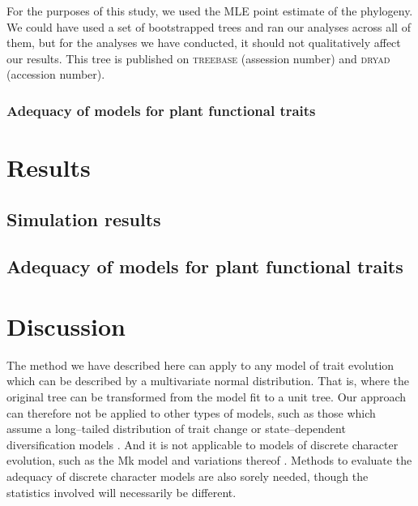 \documentclass[12pt]{article}
\begin{document}
For the purposes of this study, we used the MLE point estimate of the phylogeny. We could have used a set of bootstrapped trees and ran our analyses across all of them, but for the analyses we have conducted, it should not qualitatively affect our results. This tree is published on \textsc{treebase} (assession number) and \textsc{dryad} (accession number).

\subsubsection{Adequacy of models for plant functional traits}


\section{Results}

\subsection{Simulation results}

\subsection{Adequacy of models for plant functional traits}


\section{Discussion}

The method we have described here can apply to any model of trait evolution which can be described by a multivariate normal distribution. That is, where the original tree can be transformed from the model fit to a unit tree. Our approach can therefore not be applied to other types of models, such as those which assume a long--tailed distribution of trait change \citep[e.g.][]{Landis2012} or state--dependent diversification models \citep[e.g.][]{Bokma2008, Bokma2010, FitzJohn2010}. And it is not applicable to models of discrete character evolution, such as the Mk model \citep{Pagel1994, Lewis2001} and variations thereof \citep[e.g.][]{Maddison2007, WagnerMarcot2010, Mazeralli2012, Beaulieu2013} \citep[but see Felsenstein's threshold model;][]{Felsenstein2005, Felsenstein2012}. Methods to evaluate the adequacy of discrete character models are also sorely needed, though the statistics involved will necessarily be different.
\end{document}
